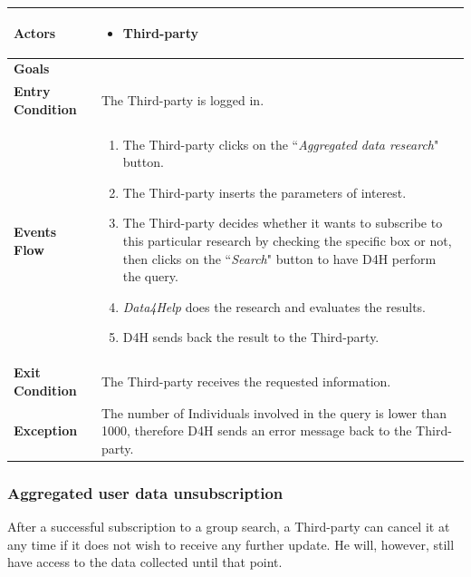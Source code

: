             \begin{table}[H]
            	\centering
                \begin{tabular}{|p{3cm}|p{8.2cm}|}
                    \hline
                    \textbf{Actors} &  \begin{itemize}
                        \item Third-party
                    \end{itemize} \\
                     \hline
                    \textbf{Goals} & \\ 
                     \hline
                    \textbf{Entry Condition} & The Third-party is logged in. \\
                     \hline
                    \textbf{Events Flow} & \begin{enumerate}
                        \item The Third-party clicks on the ``\emph{Aggregated data research}" button.
                        \item The Third-party inserts the parameters of interest.
                        \item The Third-party decides whether it wants to subscribe to this particular research by checking the specific box or not, then clicks on the ``\emph{Search}" button to have D4H perform the query.
                        \item \emph{Data4Help} does the research and evaluates the results.
                        \item D4H sends back the result to the Third-party.
                    \end{enumerate} \\
                     \hline
                    \textbf{Exit Condition} & The Third-party receives the requested information. \\
                     \hline
                    \textbf{Exception} & The number of Individuals involved in the query is lower                        than 1000, therefore D4H sends an error message back to the                      Third-party. \\
                     \hline
                \end{tabular}  
            \end{table}
            
        \subsubsection{Aggregated user data unsubscription}
        After a successful subscription to a group search, a Third-party can cancel it at any time if it does not wish to receive any further update. He will, however, still have access to the data collected until that point.
        
